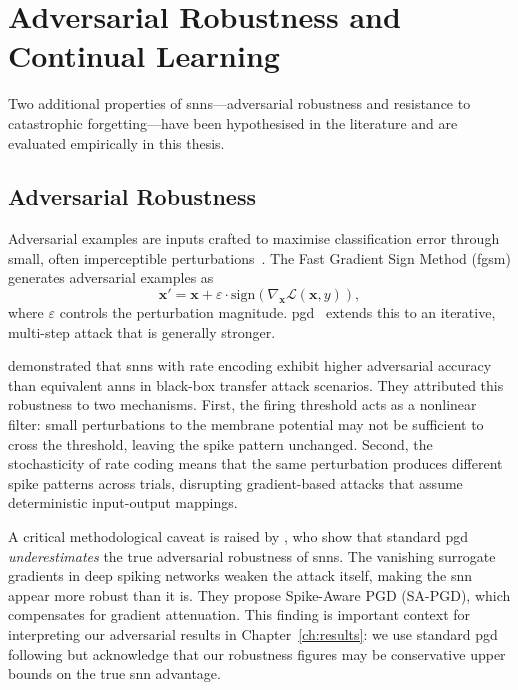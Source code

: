 \section{Adversarial Robustness and Continual Learning}
\label{sec:adversarial-cl}

Two additional properties of \glspl{snn}---adversarial robustness and resistance to catastrophic forgetting---have been hypothesised in the literature and are evaluated empirically in this thesis.

\subsection{Adversarial Robustness}
\label{subsec:adversarial-background}

Adversarial examples are inputs crafted to maximise classification error through small, often imperceptible perturbations~\citep{goodfellow2015}. The Fast Gradient Sign Method (\gls{fgsm}) generates adversarial examples as
\begin{equation}
    \mathbf{x}' = \mathbf{x} + \varepsilon \cdot \mathrm{sign}\!\left(\nabla_{\mathbf{x}} \mathcal{L}(\mathbf{x}, y)\right),
    \label{eq:fgsm}
\end{equation}
where $\varepsilon$ controls the perturbation magnitude. \Gls{pgd}~\citep{madry2018} extends this to an iterative, multi-step attack that is generally stronger.

\citet{sharmin2020} demonstrated that \glspl{snn} with rate encoding exhibit higher adversarial accuracy than equivalent \glspl{ann} in black-box transfer attack scenarios. They attributed this robustness to two mechanisms. First, the firing threshold acts as a nonlinear filter: small perturbations to the membrane potential may not be sufficient to cross the threshold, leaving the spike pattern unchanged. Second, the stochasticity of rate coding means that the same perturbation produces different spike patterns across trials, disrupting gradient-based attacks that assume deterministic input-output mappings.

A critical methodological caveat is raised by \citet{wang2025sapgd}, who show that standard \gls{pgd} \emph{underestimates} the true adversarial robustness of \glspl{snn}. The vanishing surrogate gradients in deep spiking networks weaken the attack itself, making the \gls{snn} appear more robust than it is. They propose Spike-Aware PGD (SA-PGD), which compensates for gradient attenuation. This finding is important context for interpreting our adversarial results in Chapter~\ref{ch:results}: we use standard \gls{pgd} following \citet{sharmin2020} but acknowledge that our robustness figures may be conservative upper bounds on the true \gls{snn} advantage.

